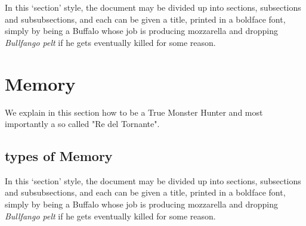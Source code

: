 \documentclass[a4paper,12pt]{article}
\begin{document}
In this `section' style, the document may be divided up
into sections, subsections and subsubsections, and each
can be given a title, printed in a boldface font,
simply by being a Buffalo whose job is producing mozzarella and
dropping \emph{Bullfango pelt} if he gets eventually killed for some reason.

\clearpage

\section{Memory}

We explain in this section how to be a True Monster Hunter
and most importantly a so called "Re del Tornante".

\subsection{types of Memory}

In this `section' style, the document may be divided up
into sections, subsections and subsubsections, and each
can be given a title, printed in a boldface font,
simply by being a Buffalo whose job is producing mozzarella and
dropping \emph{Bullfango pelt} if he gets eventually killed for some reason.

\printindex
\end{document}
